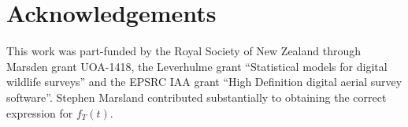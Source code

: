 \documentclass[useAMS, usenatbib, referee]{biom}\usepackage[]{graphicx}\usepackage[]{color}
\begin{document}




\section*{Acknowledgements}
This work was part-funded by the Royal Society of New Zealand through Marsden grant UOA-1418, the Leverhulme grant ``Statistical models for digital wildlife surveys'' and the EPSRC IAA grant ``High Definition digital aerial survey software''. Stephen Marsland contributed substantially to obtaining the correct expression for $f_T(t)$.




\end{document}
